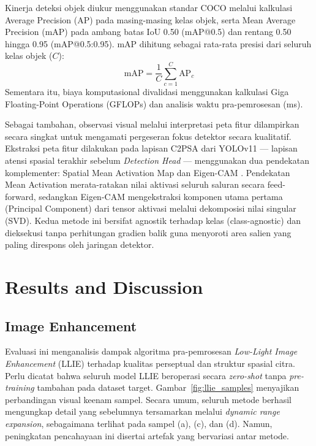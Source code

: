 \documentclass[conference]{IEEEtran}
\begin{document}
Kinerja deteksi objek diukur menggunakan standar COCO \cite{padilla2021metrics} melalui kalkulasi Average Precision (AP) pada masing-masing kelas objek, serta Mean Average Precision (mAP) pada ambang batas IoU 0.50 (mAP@0.5) dan rentang 0.50 hingga 0.95 (mAP@0.5:0.95). mAP dihitung sebagai rata-rata presisi dari seluruh kelas objek ($C$):
\begin{equation}
\text{mAP} = \frac{1}{C} \sum_{c=1}^{C} \text{AP}_c
\end{equation}
Sementara itu, biaya komputasional divalidasi menggunakan kalkulasi Giga Floating-Point Operations (GFLOPs) \cite{akavaram2025flops} dan analisis waktu pra-pemrosesan (ms).

Sebagai tambahan, observasi visual melalui interpretasi peta fitur dilampirkan secara singkat untuk mengamati pergeseran fokus detektor secara kualitatif. Ekstraksi peta fitur dilakukan pada lapisan C2PSA dari YOLOv11 — lapisan atensi spasial terakhir sebelum \textit{Detection Head} — menggunakan dua pendekatan komplementer: Spatial Mean Activation Map dan Eigen-CAM \cite{muhammad2020eigencam}. Pendekatan Mean Activation merata-ratakan nilai aktivasi seluruh saluran secara feed-forward, sedangkan Eigen-CAM mengekstraksi komponen utama pertama (Principal Component) dari tensor aktivasi melalui dekomposisi nilai singular (SVD). Kedua metode ini bersifat agnostik terhadap kelas (class-agnostic) dan dieksekusi tanpa perhitungan gradien balik guna menyoroti area salien yang paling direspons oleh jaringan detektor.

\section{Results and Discussion}
\subsection{Image Enhancement}

Evaluasi ini menganalisis dampak algoritma pra-pemrosesan \textit{Low-Light 
Image Enhancement} (LLIE) terhadap kualitas perseptual dan struktur spasial 
citra. Perlu dicatat bahwa seluruh model LLIE beroperasi secara 
\textit{zero-shot} tanpa \textit{pre-training} tambahan pada dataset target. Gambar~\ref{fig:llie_samples} menyajikan perbandingan visual keenam sampel. 
Secara umum, seluruh metode berhasil mengungkap detail yang sebelumnya 
tersamarkan melalui \textit{dynamic range expansion}, sebagaimana terlihat 
pada sampel (a), (c), dan (d). Namun, peningkatan pencahayaan ini disertai 
artefak yang bervariasi antar metode.
\end{document}
